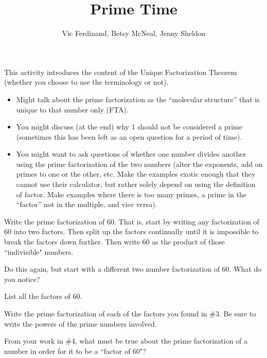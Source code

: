 \documentclass{ximera}
\title{Prime Time}
\author{Vic Ferdinand, Betsy McNeal, Jenny Sheldon}
\begin{document}
\begin{abstract} \end{abstract}
\maketitle

\begin{instructorIntro}
This activity introduces the content of the Unique Factorization Theorem (whether you choose to use the terminology or not). 

\begin{itemize}
	\item Might talk about the prime factorization as the ``molecular structure'' that is unique to that number only (FTA).
	\item You might discuss (at the end)  why 1 should not be considered a prime (sometimes this has been left as an open question for a period of time).
	\item You might want to ask questions of whether one number divides another using the prime factorization of the two numbers (alter the exponents, add on primes to one or the other, etc.  Make the examples exotic enough that they cannot use their calculator, but rather solely depend on using the definition of factor.   Make examples where there is too many primes, a prime in the ``factor'' not in the multiple, and vice versa). 
\end{itemize}
\end{instructorIntro}

\begin{problem}
 Write the prime factorization of 60.  That is, start by writing any factorization of 60 into two factors.  Then split up the factors continually until it is impossible to break the factors down further.  Then write 60 as the product of those ``indivisible" numbers.
\end{problem}
\begin{problem}
 Do this again, but start with a different two number factorization of 60.  What do you notice?
\end{problem}
\begin{problem}
 List all the factors of 60.
\end{problem}
\begin{problem}
 Write the prime factorization of each of the factors you found in $\#$3.  Be sure to write the powers of the prime numbers involved.
\end{problem}
\begin{problem}
 From your work in $\#$4, what must be true about the prime factorization of a number in order for it to be a ``factor of 60"? 
\end{problem}
\end{document}
